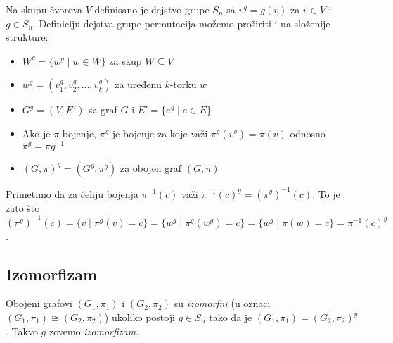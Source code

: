 \documentclass[12pt,oneside]{memoir}
\theoremstyle{definition}
\begin{document}
   Na skupu čvorova $V$ definisano je dejstvo grupe $S_n$ sa $v^g = g(v)$ za $v
   \in V$ i $g \in S_n$.  Definiciju dejstva grupe permutacija možemo proširiti
   i na složenije strukture:
   \begin{itemize}
       \item $W^g = \{w^g \mid w \in W\}$ za skup $W \subseteq V$
       \item $w^g = (v_1^g, v_2^g, \dots, v_k^g)$ za uređenu $k$-torku $w$
       \item $G^g = (V, E')$ za graf $G$ i $E' = \{e^g \mid e \in E\}$
       \item Ako je $\pi$ bojenje, $\pi^g$ je bojenje za koje važi
		   $\pi^g(v^g)=\pi(v)$ odnosno $\pi^g=\pi g^{-1}$
       \item $(G, \pi)^g = (G^g, \pi^g)$ za obojen graf $(G, \pi)$
   \end{itemize}
   Primetimo da za ćeliju bojenja $\pi^{-1}(c)$ važi $\pi^{-1}(c)^g =
   (\pi^g)^{-1}(c)$. To je zato što $(\pi^g)^{-1}(c) = \{v \mid \pi^g(v) = c\}
   = \{w^g \mid \pi^g(w^g) = c\} = \{w^g \mid \pi(w) = c\} = \pi^{-1}(c)^g$. 


   \subsection{Izomorfizam}

   Obojeni grafovi $(G_1, \pi_1)$ i $(G_2, \pi_2)$ su \emph{izomorfni} (u oznaci
   $(G_1, \pi_1) \cong (G_2, \pi_2)$) ukoliko postoji $g \in S_n$ tako da je
   $(G_1, \pi_1) = (G_2, \pi_2)^g$. Takvo $g$ zovemo \emph{izomorfizam}.
\end{document}
